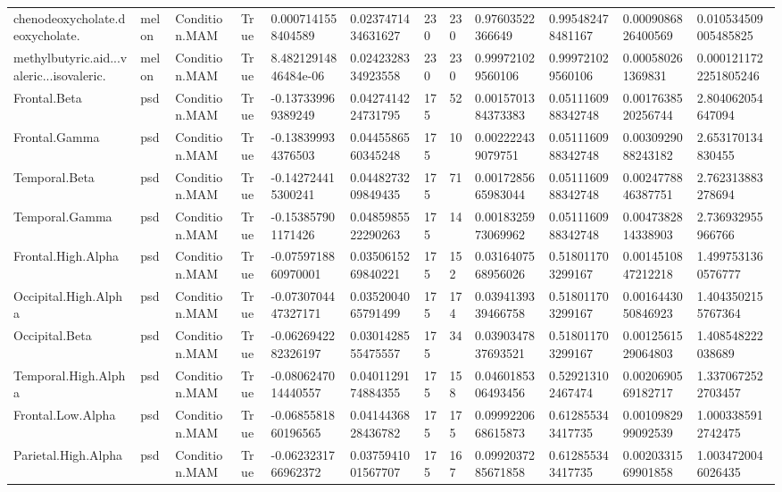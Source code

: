 \begin{longtable}{llllllllllll}
chenodeoxycholate.deoxycholate. & melon & Condition.MAM & True & 0.0007141558404589 & 0.0237471434631627 & 230 & 230 & 0.97603522366649 & 0.995482478481167 & 0.0009086826400569 & 0.010534509005485825 \\
methylbutyric.aid...valeric...isovaleric. & melon & Condition.MAM & True & 8.48212914846484e-06 & 0.0242328334923558 & 230 & 230 & 0.999721029560106 & 0.999721029560106 & 0.000580261369831 & 0.0001211722251805246 \\
Frontal.Beta & psd & Condition.MAM & True & -0.137339969389249 & 0.0427414224731795 & 175 & 52 & 0.0015701384373383 & 0.0511160988342748 & 0.0017638520256744 & 2.804062054647094 \\
Frontal.Gamma & psd & Condition.MAM & True & -0.138399934376503 & 0.0445586560345248 & 175 & 10 & 0.002222439079751 & 0.0511160988342748 & 0.0030929088243182 & 2.653170134830455 \\
Temporal.Beta & psd & Condition.MAM & True & -0.142724415300241 & 0.0448273209849435 & 175 & 71 & 0.0017285665983044 & 0.0511160988342748 & 0.0024778846387751 & 2.762313883278694 \\
Temporal.Gamma & psd & Condition.MAM & True & -0.153857901171426 & 0.0485985522290263 & 175 & 14 & 0.0018325973069962 & 0.0511160988342748 & 0.0047382814338903 & 2.736932955966766 \\
Frontal.High.Alpha & psd & Condition.MAM & True & -0.0759718860970001 & 0.0350615269840221 & 175 & 152 & 0.0316407568956026 & 0.518011703299167 & 0.0014510847212218 & 1.4997531360576777 \\
Occipital.High.Alpha & psd & Condition.MAM & True & -0.0730704447327171 & 0.0352004065791499 & 175 & 174 & 0.0394139339466758 & 0.518011703299167 & 0.0016443050846923 & 1.4043502155767364 \\
Occipital.Beta & psd & Condition.MAM & True & -0.0626942282326197 & 0.0301428555475557 & 175 & 34 & 0.0390347837693521 & 0.518011703299167 & 0.0012561529064803 & 1.408548222038689 \\
Temporal.High.Alpha & psd & Condition.MAM & True & -0.0806247014440557 & 0.0401129174884355 & 175 & 158 & 0.0460185306493456 & 0.529213102467474 & 0.0020690569182717 & 1.3370672522703457 \\
Frontal.Low.Alpha & psd & Condition.MAM & True & -0.0685581860196565 & 0.0414436828436782 & 175 & 175 & 0.0999220668615873 & 0.612855343417735 & 0.0010982999092539 & 1.0003385912742475 \\
Parietal.High.Alpha & psd & Condition.MAM & True & -0.0623231766962372 & 0.0375941001567707 & 175 & 167 & 0.0992037285671858 & 0.612855343417735 & 0.0020331569901858 & 1.0034720046026435 \\

\end{longtable}
